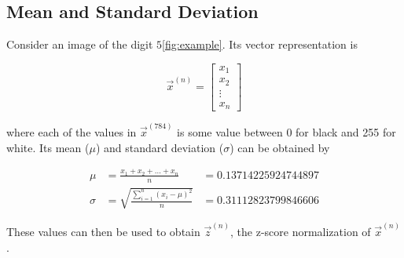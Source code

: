 \subsection{Mean and Standard Deviation}
Consider an image of the digit $5$\cref{fig:example}. Its vector representation is

\begin{equation*}
	\vec{x}^{(n)}  =
	\begin{bmatrix}
		x_1    \\
		x_2    \\
		\vdots \\
		x_n
	\end{bmatrix}
\end{equation*}

where each of the values in $\vec{x}^{(784)}$ is some value between 0 for black
and 255 for white. Its mean ($\mu$) and standard deviation ($\sigma$) can be
obtained by

\begin{equation*}
	\begin{aligned}
		\mu    & = \frac{x_1 + x_2 + \ldots + x_n}{n}            & = 0.13714225924744897 \\
		\sigma & = \sqrt{\frac{\sum_{i=1}^{n} (x_i - \mu)^2}{n}} & = 0.31112823799846606
	\end{aligned}
\end{equation*}

These values can then be used to obtain $\vec{z}^{(n)}$, the z-score
normalization of $\vec{x}^{(n)}$.
